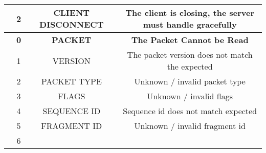 \begin{table}[H]
\begin{tabular}{|ccclcllll|}
    \rowcolor[HTML]{FFDDDD} 
    \multicolumn{1}{|c|}{\multirow{-3}{*}{\cellcolor[HTML]{FFDDDD}\textbf{2}}} &
      \multicolumn{1}{c|}{\cellcolor[HTML]{FFDDDD}2} &
      \multicolumn{2}{c|}{\cellcolor[HTML]{FFDDDD}CLIENT DISCONNECT} &
      \multicolumn{5}{c|}{\cellcolor[HTML]{FFDDDD}The client is closing, the   server must handle gracefully} \\ \hline
    \rowcolor[HTML]{DEFEDF} 
    \multicolumn{1}{|c|}{\cellcolor[HTML]{FFF8DD}} &
      \multicolumn{1}{c|}{\cellcolor[HTML]{DEFEDF}\textbf{0}} &
      \multicolumn{2}{c|}{\cellcolor[HTML]{DEFEDF}\textbf{PACKET}} &
      \multicolumn{5}{c|}{\cellcolor[HTML]{DEFEDF}\textbf{The Packet Cannot be   Read}} \\ \cline{2-9} 
    \rowcolor[HTML]{FFF8DD} 
    \multicolumn{1}{|c|}{\cellcolor[HTML]{FFF8DD}} &
      \multicolumn{1}{c|}{\cellcolor[HTML]{FFF8DD}1} &
      \multicolumn{2}{c|}{\cellcolor[HTML]{FFF8DD}VERSION} &
      \multicolumn{5}{c|}{\cellcolor[HTML]{FFF8DD}The packet version does not   match the expected} \\ \cline{2-9} 
    \rowcolor[HTML]{FFDDDD} 
    \multicolumn{1}{|c|}{\cellcolor[HTML]{FFF8DD}} &
      \multicolumn{1}{c|}{\cellcolor[HTML]{FFDDDD}2} &
      \multicolumn{2}{c|}{\cellcolor[HTML]{FFDDDD}PACKET TYPE} &
      \multicolumn{5}{c|}{\cellcolor[HTML]{FFDDDD}Unknown / invalid packet   type} \\ \cline{2-9} 
    \rowcolor[HTML]{FFF8DD} 
    \multicolumn{1}{|c|}{\cellcolor[HTML]{FFF8DD}} &
      \multicolumn{1}{c|}{\cellcolor[HTML]{FFF8DD}3} &
      \multicolumn{2}{c|}{\cellcolor[HTML]{FFF8DD}FLAGS} &
      \multicolumn{5}{c|}{\cellcolor[HTML]{FFF8DD}Unknown / invalid flags} \\ \cline{2-9} 
    \rowcolor[HTML]{FFDDDD} 
    \multicolumn{1}{|c|}{\cellcolor[HTML]{FFF8DD}} &
      \multicolumn{1}{c|}{\cellcolor[HTML]{FFDDDD}4} &
      \multicolumn{2}{c|}{\cellcolor[HTML]{FFDDDD}SEQUENCE ID} &
      \multicolumn{5}{c|}{\cellcolor[HTML]{FFDDDD}Sequence id does not match   expected} \\ \cline{2-9} 
    \rowcolor[HTML]{FFF8DD} 
    \multicolumn{1}{|c|}{\cellcolor[HTML]{FFF8DD}} &
      \multicolumn{1}{c|}{\cellcolor[HTML]{FFF8DD}5} &
      \multicolumn{2}{c|}{\cellcolor[HTML]{FFF8DD}FRAGMENT ID} &
      \multicolumn{5}{c|}{\cellcolor[HTML]{FFF8DD}Unknown / invalid fragment   id} \\ \cline{2-9} 
    \rowcolor[HTML]{FFDDDD} 
    \multicolumn{1}{|c|}{\cellcolor[HTML]{FFF8DD}} &
      \multicolumn{1}{c|}{\cellcolor[HTML]{FFDDDD}6} &

\end{tabular}
\end{table}
